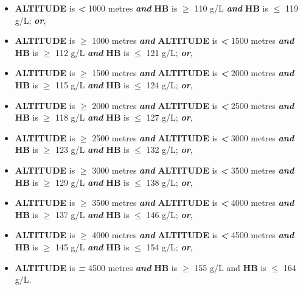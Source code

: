 \documentclass[12pt,a4paper]{article}
\begin{document}
\begin{itemize}
  \begin{itemize}
  \item
    \textbf{ALTITUDE} is \textbf{\emph{\textless{}}} 1000 metres \textbf{\emph{and}} \textbf{HB} is \textbf{\emph{\(\geq\)}} 110 g/L \textbf{\emph{and}} \textbf{HB} is \textbf{\emph{\(\leq\)}} 119 g/L; \textbf{\emph{or}},
  \item
    \textbf{ALTITUDE} is \textbf{\emph{\(\geq\)}} 1000 metres \textbf{\emph{and}} \textbf{ALTITUDE} is \textbf{\emph{\textless{}}} 1500 metres \textbf{\emph{and}} \textbf{HB} is \textbf{\emph{\(\geq\)}} 112 g/L \textbf{\emph{and}} \textbf{HB} is \textbf{\emph{\(\leq\)}} 121 g/L; \textbf{\emph{or}},
  \item
    \textbf{ALTITUDE} is \textbf{\emph{\(\geq\)}} 1500 metres \textbf{\emph{and}} \textbf{ALTITUDE} is \textbf{\emph{\textless{}}} 2000 metres \textbf{\emph{and}} \textbf{HB} is \textbf{\emph{\(\geq\)}} 115 g/L \textbf{\emph{and}} \textbf{HB} is \textbf{\emph{\(\leq\)}} 124 g/L; \textbf{\emph{or}},
  \item
    \textbf{ALTITUDE} is \textbf{\emph{\(\geq\)}} 2000 metres \textbf{\emph{and}} \textbf{ALTITUDE} is \textbf{\emph{\textless{}}} 2500 metres \textbf{\emph{and}} \textbf{HB} is \textbf{\emph{\(\geq\)}} 118 g/L \textbf{\emph{and}} \textbf{HB} is \textbf{\emph{\(\leq\)}} 127 g/L; \textbf{\emph{or}},
  \item
    \textbf{ALTITUDE} is \textbf{\emph{\(\geq\)}} 2500 metres \textbf{\emph{and}} \textbf{ALTITUDE} is \textbf{\emph{\textless{}}} 3000 metres \textbf{\emph{and}} \textbf{HB} is \textbf{\emph{\(\geq\)}} 123 g/L \textbf{\emph{and}} \textbf{HB} is \textbf{\emph{\(\leq\)}} 132 g/L; \textbf{\emph{or}},
  \item
    \textbf{ALTITUDE} is \textbf{\emph{\(\geq\)}} 3000 metres \textbf{\emph{and}} \textbf{ALTITUDE} is \textbf{\emph{\textless{}}} 3500 metres \textbf{\emph{and}} \textbf{HB} is \textbf{\emph{\(\geq\)}} 129 g/L \textbf{\emph{and}} \textbf{HB} is \textbf{\emph{\(\leq\)}} 138 g/L; \textbf{\emph{or}},
  \item
    \textbf{ALTITUDE} is \textbf{\emph{\(\geq\)}} 3500 metres \textbf{\emph{and}} \textbf{ALTITUDE} is \textbf{\emph{\textless{}}} 4000 metres \textbf{\emph{and}} \textbf{HB} is \textbf{\emph{\(\geq\)}} 137 g/L \textbf{\emph{and}} \textbf{HB} is \textbf{\emph{\(\leq\)}} 146 g/L; \textbf{\emph{or}},
  \item
    \textbf{ALTITUDE} is \textbf{\emph{\(\geq\)}} 4000 metres \textbf{\emph{and}} \textbf{ALTITUDE} is \textbf{\emph{\textless{}}} 4500 metres \textbf{\emph{and}} \textbf{HB} is \textbf{\emph{\(\geq\)}} 145 g/L \textbf{\emph{and}} \textbf{HB} is \textbf{\emph{\(\leq\)}} 154 g/L; \textbf{\emph{or}},
  \item
    \textbf{ALTITUDE} is \textbf{\emph{=}} 4500 metres \textbf{\emph{and}} \textbf{HB} is \textbf{\emph{\(\geq\)}} 155 g/L and \textbf{HB} is \textbf{\emph{\(\leq\)}} 164 g/L.
  \end{itemize}
\end{itemize}
\end{document}

